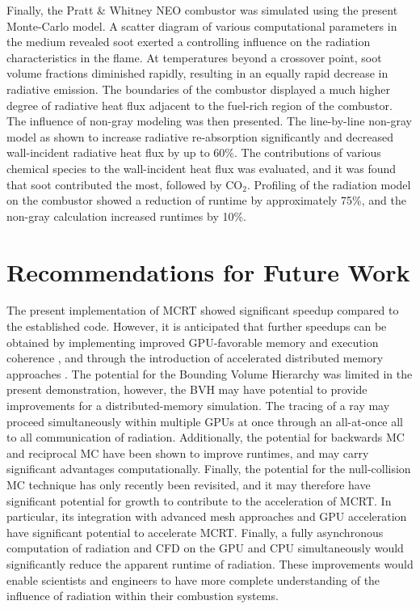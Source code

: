 Finally, the Pratt \& Whitney NEO combustor was simulated using the present Monte-Carlo model. A scatter diagram of various computational parameters in the medium revealed soot exerted a controlling influence on the radiation characteristics in the flame. At temperatures beyond a crossover point, soot volume fractions diminished rapidly, resulting in an equally rapid decrease in radiative emission. The boundaries of the combustor displayed a much higher degree of radiative heat flux adjacent to the fuel-rich region of the combustor. The influence of non-gray modeling was then presented. The line-by-line non-gray model as shown to increase radiative re-absorption significantly and decreased wall-incident radiative heat flux by up to $60$\%. The contributions of various chemical species to the wall-incident heat flux was evaluated, and it was found that soot contributed the most, followed by CO$_2$. 
Profiling of the radiation model on the combustor showed a reduction of runtime by approximately 75\%, and the non-gray calculation increased runtimes by 10\%.

\section{Recommendations for Future Work}
The present implementation of MCRT showed significant speedup compared to the established code. However, it is anticipated that further speedups can be obtained by implementing improved GPU-favorable memory and execution coherence \cite{Silvestri2019ASimulation}, and through the introduction of accelerated distributed memory approaches \cite{Humphrey2015ATracing}. The potential for the Bounding Volume Hierarchy was limited in the present demonstration, however, the BVH may have potential to provide improvements for a distributed-memory simulation. The tracing of a ray may proceed simultaneously within multiple GPUs at once through an all-at-once all to all communication of radiation. 
Additionally, the potential for backwards MC and reciprocal MC have been shown to improve runtimes, and may carry significant advantages computationally. Finally, the potential for the null-collision MC technique has only recently been revisited, and it may therefore have significant potential for growth to contribute to the acceleration of MCRT. In particular, its integration with advanced mesh approaches and GPU acceleration have significant potential to accelerate MCRT.
Finally, a fully asynchronous computation of radiation and CFD on the GPU and CPU simultaneously would significantly reduce the apparent runtime of radiation. 
These improvements would enable scientists and engineers to have more complete understanding of the influence of radiation within their combustion systems. 